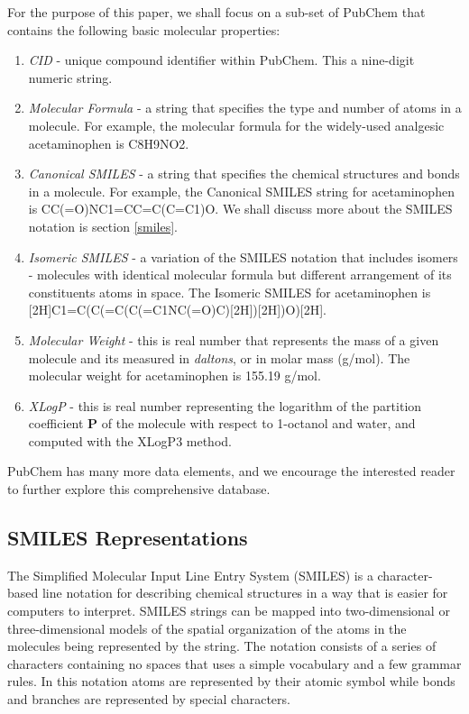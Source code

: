 For the purpose of this paper, we shall focus on a sub-set of PubChem that contains the following basic molecular properties:
\begin{enumerate}
	\item {\em CID} - unique compound identifier within PubChem. This a nine-digit numeric string. 
	\item {\em Molecular Formula} -  a string that specifies the type and number of atoms in a molecule. For example, the molecular formula for the widely-used analgesic acetaminophen is C8H9NO2.
	\item {\em Canonical SMILES} - a string that specifies the chemical structures and bonds in a molecule. For example, the Canonical SMILES string for acetaminophen is CC(=O)NC1=CC=C(C=C1)O. We shall discuss more about the SMILES notation is section \ref{smiles}.
	\item {\em Isomeric SMILES} - a variation of the SMILES notation that includes isomers - molecules with identical molecular formula but different arrangement of its constituents atoms in space. The Isomeric SMILES for acetaminophen is [2H]C1=C(C(=C(C(=C1NC(=O)C)[2H])[2H])O)[2H].
	\item {\em Molecular Weight} - this is real number that represents the mass of a given molecule and its measured in {\em daltons}, or in molar mass (g/mol). The molecular weight for acetaminophen is 155.19 g/mol.
	\item {\em XLogP} - this is real number representing the logarithm of the partition coefficient $\boldsymbol P$ of the molecule with respect to 1-octanol and water, and computed with the XLogP3 method. 
\end{enumerate}
PubChem has many more data elements, and we encourage the interested reader to further explore this comprehensive database. 

\subsection{SMILES Representations\label{smiles}}
The Simplified Molecular Input Line Entry System (SMILES) is a character-based line notation for describing chemical structures in a way that is easier for computers to interpret. SMILES strings can be mapped into two-dimensional or three-dimensional models of the spatial organization of the atoms in the molecules being represented by the string. The notation consists of a series of characters containing no spaces that uses a simple vocabulary and a few grammar rules. In this notation atoms are represented by their atomic symbol while bonds and branches are represented by special characters.

